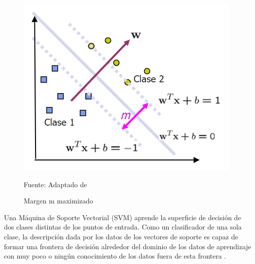 \begin{figure}[htb]
	\centering
	\includegraphics[scale  = 0.70]{Imagenes/maxim.png}
	\caption{Margen m maximizado}{Fuente: Adaptado de ~\cite{betancourt}}
\end{figure}

Una Máquina de Soporte Vectorial (SVM) aprende la superficie de decisión de dos clases distintas de los puntos de entrada. Como un clasificador de una sola clase, la descripción dada por los datos de los vectores de soporte es capaz de formar una frontera de decisión alrededor del dominio de los datos de aprendizaje con muy poco o ningún conocimiento de los datos fuera de esta frontera \cite{betancourt}.